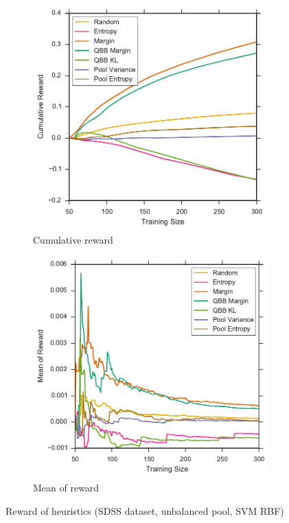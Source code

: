 \begin{figure}[p]
	\centering
	\begin{subfigure}{.5\textwidth}
		\centering
		\includegraphics[width=0.99\textwidth]{figures/5_thompson/sdss_ur_sum_rewards}
		\caption{Cumulative reward}
		\label{fig:sdss_ur_sum_rewards}
	\end{subfigure}%
	\begin{subfigure}{.5\textwidth}
		\centering
		\includegraphics[width=0.99\linewidth]{figures/5_thompson/sdss_ur_avg_rewards}
		\caption{Mean of reward}
		\label{fig:sdss_ur_avg_rewards}
	\end{subfigure}
	\caption[Reward of heuristics (SDSS, unbalanced, SVM RBF)]{
		Reward of heuristics (SDSS dataset, unbalanced pool, SVM RBF)}
	\label{fig:sdss_ur_rewards}
\end{figure}



